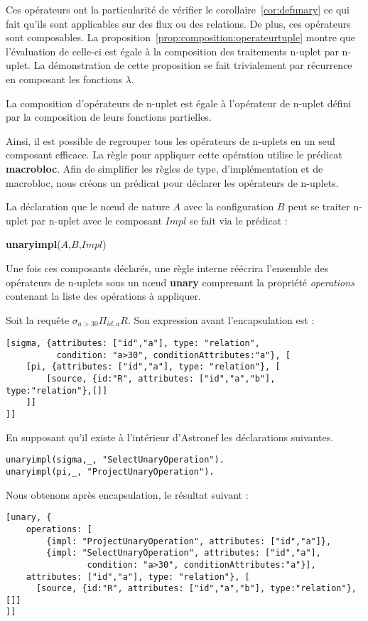 Ces opérateurs ont la particularité de vérifier le corollaire~\ref{cor:defunary} ce qui fait qu'ils sont applicables sur des flux ou des relations. De plus, ces opérateurs sont composables. La proposition~\ref{prop:composition:operateurtuple} montre que l'évaluation de celle-ci est égale à la composition des traitements n-uplet par n-uplet. La démonstration de cette proposition se fait trivialement par récurrence en composant les fonctions $\lambda$.
\begin{prop}\label{prop:composition:operateurtuple}
    La composition d'opérateurs de n-uplet est égale à l'opérateur de n-uplet défini par la composition de leurs fonctions partielles.
\end{prop}

Ainsi, il est possible de regrouper tous les opérateurs de n-uplets en un seul composant efficace. La règle pour appliquer cette opération utilise le prédicat \textbf{macrobloc}. Afin de simplifier les règles de type, d'implémentation et de macrobloc, nous créons un prédicat pour déclarer les opérateurs de n-uplets.
\begin{regle}
La déclaration que le nœud de nature $A$ avec la configuration $B$ peut se traiter n-uplet par n-uplet avec le composant $Impl$ se fait via le prédicat :
\begin{center}\textbf{unaryimpl}($A$,$B$,$Impl$)\end{center}
\end{regle}

Une fois ces composants déclarés, une règle interne réécrira l'ensemble des opérateurs de n-uplets sous un nœud \textbf{unary} comprenant la propriété \textit{operations} contenant la liste des opérations à appliquer.
\begin{example}
Soit la requête $\sigma_{a > 30}\Pi_{id,a} R$. Son expression avant l'encapsulation est :
\begin{lstlisting}
[sigma, {attributes: ["id","a"], type: "relation", 
		  condition: "a>30", conditionAttributes:"a"}, [
	[pi, {attributes: ["id","a"], type: "relation"}, [
		[source, {id:"R", attributes: ["id","a","b"], type:"relation"},[]]
	]]
]]
\end{lstlisting}

En supposant qu'il existe à l'intérieur d'Astronef les déclarations suivantes.
\begin{lstlisting}
unaryimpl(sigma,_, "SelectUnaryOperation").
unaryimpl(pi,_, "ProjectUnaryOperation").
\end{lstlisting}

Nous obtenons après encapsulation, le résultat suivant :
\begin{lstlisting}
[unary, {
	operations: [
		{impl: "ProjectUnaryOperation", attributes: ["id","a"]},
		{impl: "SelectUnaryOperation", attributes: ["id","a"], 
				condition: "a>30", conditionAttributes:"a"}], 
	attributes: ["id","a"], type: "relation"}, [
	  [source, {id:"R", attributes: ["id","a","b"], type:"relation"},[]]
]]
\end{lstlisting}
\end{example}


